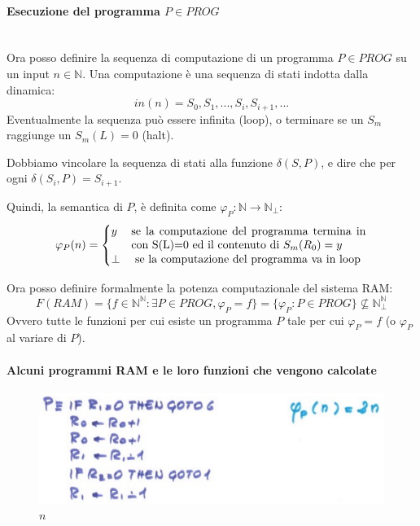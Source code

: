 \documentclass{article}
\begin{document}
\begin{itemize}
          \paragraph{Esecuzione del programma $P\in PROG$}\mbox{}\\
          Ora posso definire la sequenza di computazione di un programma $P\in PROG$ su un input $n\in\mathbb{N}$.
          Una computazione è una sequenza di stati indotta dalla dinamica:
          $$in(n)=S_0, S_1,...,S_i,S_{i+1},...$$
          Eventualmente la sequenza può essere infinita (loop), o terminare se un $S_m$
          raggiunge un $S_m(L)=0$ (halt).

          Dobbiamo vincolare la sequenza di stati alla funzione $\delta (S,P)$,
          e dire che per ogni $\delta(S_i,P)= S_{i+1}$.

          Quindi, la semantica di $P$, è definita come $\varphi_P:\mathbb{N}\rightarrow\mathbb{N}_\bot$:
          \[
              \varphi_P(n)=
              \begin{cases}
                  y    & \parbox[t]{.6\textwidth}{se la computazione del programma termina in con  S(L)=0
                  ed il contenuto di $S_m(R_0)=y$}                                                        \\
                  \bot & \text{ se la computazione del programma va in loop}
              \end{cases}
          \]
\end{itemize}
Ora posso definire formalmente la potenza computazionale del sistema RAM:
$$F(RAM)=\{f\in\mathbb{N}^{\mathbb{N}}:\exists P\in PROG,\varphi_P = f\}=\{\varphi_P : P\in PROG\}\nsubseteq\mathbb{N}^{\mathbb{N}}_{\bot}$$
Ovvero tutte le funzioni per cui esiste un programma $P$ tale per cui $\varphi_P = f$ (o $\varphi_P$ al variare di $P$).

\paragraph{Alcuni programmi RAM e le loro funzioni che vengono calcolate}\mbox{}
\begin{figure}[H]
    \centering
    \includegraphics[scale=0.5]{images/2n.png}
    \caption{$n$}
\end{figure}
\end{document}
